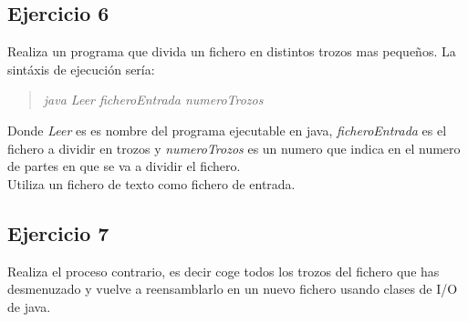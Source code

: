 \documentclass[4paper]{article}
\begin{document}
\subsection*{Ejercicio 6}
Realiza un programa que divida un fichero en distintos trozos mas pequeños. La sintáxis de ejecución sería:
\begin{quote}
\emph{java Leer ficheroEntrada numeroTrozos}
\end{quote}
Donde \emph{Leer} es es nombre del programa ejecutable en java, \emph{ficheroEntrada} es el fichero a dividir en trozos y \emph{numeroTrozos} es un numero que indica en el numero de partes en que se va a dividir el fichero.\\
Utiliza un fichero de texto como fichero de entrada.


\subsection*{Ejercicio 7}
Realiza el proceso contrario, es decir coge todos los trozos del fichero que has desmenuzado y vuelve a reensamblarlo en un nuevo fichero usando clases de I/O de java.
\end{document}
